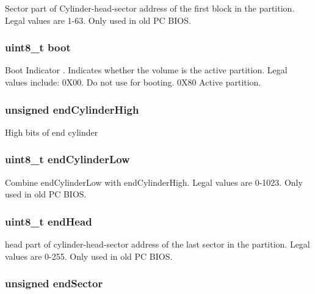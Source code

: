 Sector part of Cylinder-\/head-\/sector address of the first block in the partition. Legal values are 1-\/63. Only used in old P\-C B\-I\-O\-S. \hypertarget{structpartition_table_ad2acb7fab9ef33a6f00c834401250229}{
\subsubsection[{boot}]{\setlength{\rightskip}{0pt plus 5cm}uint8\-\_\-t boot}}\label{structpartition_table_ad2acb7fab9ef33a6f00c834401250229}
Boot Indicator . Indicates whether the volume is the active partition. Legal values include\-: 0\-X00. Do not use for booting. 0\-X80 Active partition. \hypertarget{structpartition_table_adeccbdcad0d989d1e33a07b435ab7300}{
\subsubsection[{end\-Cylinder\-High}]{\setlength{\rightskip}{0pt plus 5cm}unsigned end\-Cylinder\-High}}\label{structpartition_table_adeccbdcad0d989d1e33a07b435ab7300}
High bits of end cylinder \hypertarget{structpartition_table_a3eb4b87675075500899edbb9296e0435}{
\subsubsection[{end\-Cylinder\-Low}]{\setlength{\rightskip}{0pt plus 5cm}uint8\-\_\-t end\-Cylinder\-Low}}\label{structpartition_table_a3eb4b87675075500899edbb9296e0435}
Combine end\-Cylinder\-Low with end\-Cylinder\-High. Legal values are 0-\/1023. Only used in old P\-C B\-I\-O\-S. \hypertarget{structpartition_table_a248e6a8c42872744129b8b85a864a7a6}{
\subsubsection[{end\-Head}]{\setlength{\rightskip}{0pt plus 5cm}uint8\-\_\-t end\-Head}}\label{structpartition_table_a248e6a8c42872744129b8b85a864a7a6}
head part of cylinder-\/head-\/sector address of the last sector in the partition. Legal values are 0-\/255. Only used in old P\-C B\-I\-O\-S. \hypertarget{structpartition_table_a1412f3c5116885eb7d4a047e432c9cdd}{
\subsubsection[{end\-Sector}]{\setlength{\rightskip}{0pt plus 5cm}unsigned end\-Sector}}\label{structpartition_table_a1412f3c5116885eb7d4a047e432c9cdd}
